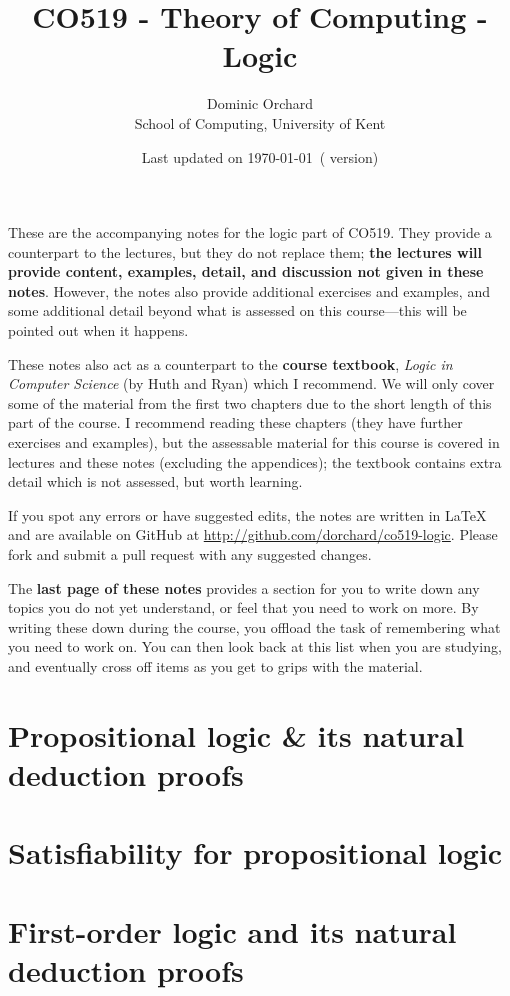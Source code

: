 \documentclass[a4paper]{article}
\title{\vspace{-3em}CO519 - Theory of Computing - Logic}
\author{Dominic Orchard \\
  {\small{School of Computing, University of Kent}}}
\date{Last updated on \today\ {\small{(\version{} version)}}}
\theoremstyle{definition}
\begin{document}
\maketitle

\noindent
These are the accompanying notes for the logic part of CO519. They
provide a counterpart to the lectures, but they do not replace them; \textbf{the
lectures will provide content, examples, detail, and discussion not given in
these notes}.  However, the notes also provide additional exercises and
examples, and some additional detail beyond what is assessed on this
course---this will be pointed out when it happens.

These notes also act as a counterpart to the \textbf{course textbook},
\emph{Logic in Computer Science} (by Huth and Ryan) which I
recommend. We will only cover some of the material from the first two
chapters due to the short length of this part of the course. I
recommend reading these chapters (they have further exercises and
examples), but the assessable material for this course is covered in
lectures and these notes (excluding the appendices); the textbook
contains extra detail which is not assessed, but worth learning.

If you spot any errors or have suggested edits, the notes are written
in LaTeX and are available on GitHub at
\url{http://github.com/dorchard/co519-logic}. Please fork and submit a
pull request with any suggested changes.

The \textbf{last page of these notes} provides a section for you to
write down any topics you do not yet understand, or feel that you need
to work on more. By writing these down during the course, you offload
the task of remembering what you need to work on. You can then look
back at this list when you are studying, and eventually cross off items
as you get to grips with the material.

\part{Propositional logic \& its natural deduction proofs}


\part{Satisfiability for propositional logic}
\setcounter{section}{0}


\part{First-order logic and its natural deduction proofs}
\setcounter{section}{0}

\end{document}
